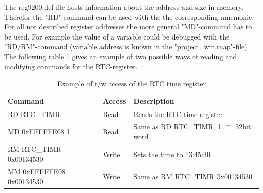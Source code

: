 The reg9200.def-file hosts information about the address and size in memory. Therefor the "RD"-command can be used with the the corresponding mnemonic. For all not described register addresses the more general "MD"-command has to be used. For example the value of a variable could be debugged with the "RD/RM"-command (variable address is known in the "project\_win.map"-file)
The following table \ref{tab:CCM} gives an example of two possible ways of reading and modifying commands for the \acs{RTC}-register.
\begin{table}[H]
\begin{tabular}{lll} %
\textbf{Command}	 &\textbf{Access}&\textbf{Description}\\
\hline
\hline
RD RTC\_TIMR & Read& Reads the \acs{RTC}-time register\\%
MD 0xFFFFFE08 1& Read& Same as RD RTC\_TIMR, 1 $\hat{=}$ 32bit word\\
\hline
RM RTC\_TIMR 0x00134530& Write& Sets the time to 13:45:30 \\%
MM 0xFFFFFE08 0x00134530& Write& Same as RM RTC\_TIMR 0x00134530\\
\end{tabular}
\caption[Example of r/w access of the \acs{RTC} time register]{Example of r/w access of the \acs{RTC} time register\footnotemark}
\label{tab:CCM}
\end{table}



